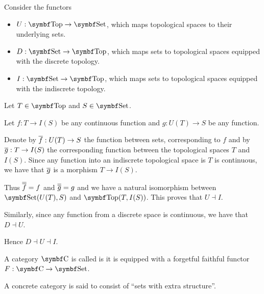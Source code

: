 \begin{example}\label{ex:top_adjoint_functor}\cite[example 2.1.5]{Leinster2014}
  Consider the functors
  \begin{itemize}
    \item \( U: \Cat{Top} \to \Bold{Set} \), which maps topological spaces to their underlying sets.
    \item \( D: \Cat{Set} \to \Bold{Top} \), which maps sets to topological spaces equipped with the discrete topology.
    \item \( I: \Cat{Set} \to \Bold{Top} \), which maps sets to topological spaces equipped with the indiscrete topology.
  \end{itemize}

  Let \( T \in \Cat{Top} \) and \( S \in \Bold{Set} \).

  Let \( f: T \to I(S) \) be any continuous function and \( g: U(T) \to S \) be any function.

  Denote by \( \overline{f}: U(T) \to S \) the function between sets, corresponding to \( f \) and by \( \overline{g}: T \to I(S) \) the corresponding function between the topological spaces \( T \) and \( I(S) \). Since any function into an indiscrete topological space is \( T \) is continuous, we have that \( \overline{g} \) is a morphism \( T \to I(S) \).

  Thus \( \overline{\overline{f}} = f \) and \( \overline{\overline{g}} = g \) and we have a natural isomorphism between \( \Cat{Set}(U(T), S) \) and \( \Bold{Top}(T, I(S)) \). This proves that \( U \dashv I \).

  Similarly, since any function from a discrete space is continuous, we have that \( D \dashv U \).

  Hence \( D \dashv U \dashv I \).
\end{example}

\begin{definition}\label{def:concrete_category}
  A category \( \Bold C \) is called  is it is equipped with a forgetful faithful functor \( F: \Cat{C} \to \Bold{Set} \).

  A concrete category is said to consist of \enquote{sets with extra structure}.
\end{definition}

